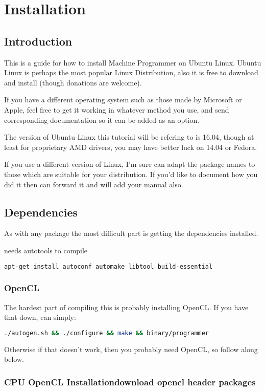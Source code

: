 \documentclass[12pt]{report}
\begin{document}
\chapter{Installation}
\section{Introduction}
This is a guide for how to install Machine Programmer on Ubuntu
Linux\cite{Ubuntu}.
Ubuntu Linux is perhaps the most popular Linux Distribution,
also it is free to download and install (though donations are welcome).

If you have a different operating system such as those made by Microsoft or
Apple, feel free to get it working in whatever method you use, and send
corresponding documentation so it can be added as an option.

The version of Ubuntu Linux this tutorial will be refering to is 16.04,
though at least for proprietary AMD drivers, you may have better luck on 14.04
or Fedora.

If you use a different version of Linux, I'm sure can adapt the package names to
those which are suitable for your distribution.  If you'd like to document how
you did it then can forward it and will add your manual also.

\section{Dependencies}
As with any package the most difficult part is getting the dependencies
installed.

needs autotools to compile
\begin{lstlisting}[language=bash]
apt-get install autoconf automake libtool build-essential
\end{lstlisting}

\subsection{OpenCL}
The hardest part of compiling this is probably installing OpenCL.
If you have that down, can simply:
\begin{lstlisting}[language=bash]
./autogen.sh && ./configure && make && binary/programmer
\end{lstlisting}

Otherwise if that doesn't work, then you probably need OpenCL,
so follow along below.

\subsection{CPU OpenCL Installationdownload opencl header packages}
\end{document}
